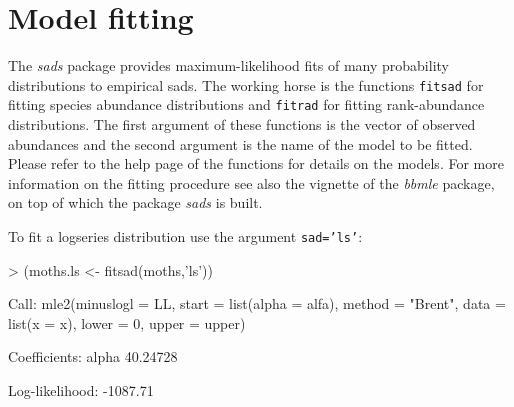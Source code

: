 \documentclass[11pt, A4]{article}
\newcommand{\code}[1]{\texttt{#1}}
\begin{document}
\section{Model fitting}
\label{sec:ajuste-e-selecao}
The \emph{sads} package provides maximum-likelihood fits of many
probability distributions to empirical sads. The working horse is the
functions \code{fitsad} for fitting species abundance distributions
and \code{fitrad} for fitting rank-abundance distributions. The first
argument of these functions is the vector of observed abundances and
the second argument is the name of the model to be fitted.
Please refer to the help
page of the functions for details on the models. For more information
on the fitting procedure see also the vignette of
the \emph{bbmle} package, on top of which the package \emph{sads} is built.

To fit a logseries distribution use the argument \code{sad='ls'}:

\begin{Schunk}
\begin{Sinput}
> (moths.ls <- fitsad(moths,'ls'))
\end{Sinput}
\begin{Soutput}
Call:
mle2(minuslogl = LL, start = list(alpha = alfa), method = "Brent", 
    data = list(x = x), lower = 0, upper = upper)

Coefficients:
   alpha 
40.24728 

Log-likelihood: -1087.71 
\end{Soutput}
\end{Schunk}
\end{document}
